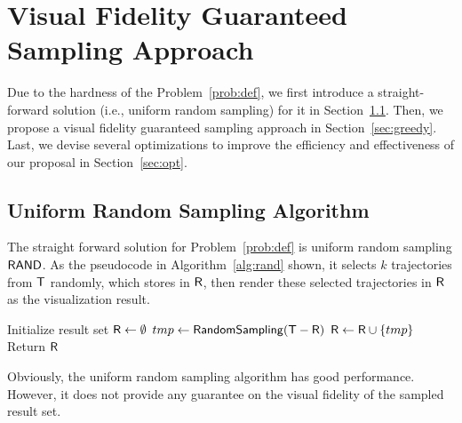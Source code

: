 \section{Visual Fidelity Guaranteed Sampling Approach}\label{sec:sol}
Due to the hardness of the Problem~\ref{prob:def}, we first introduce a straight-forward solution (i.e., uniform random sampling) for it in Section~\ref{sec:random}.
Then, we propose a visual fidelity guaranteed sampling approach in Section~\ref{sec:greedy}.
Last, we devise several optimizations to improve the efficiency and effectiveness of our proposal in Section~\ref{sec:opt}.


\subsection{Uniform Random Sampling Algorithm}\label{sec:random}
The straight forward solution for Problem~\ref{prob:def} is uniform random sampling $\mathsf{RAND}$.
As the pseudocode in Algorithm~\ref{alg:rand} shown, it selects $k$ trajectories from $\mathsf{T}$ randomly, which stores in $\mathsf{R}$,
then render these selected trajectories in $\mathsf{R}$ as the visualization result.

\begin{algorithm}
    \caption{$\rand(\D,k=\alpha |\D|)$} \label{alg:rand}
    \begin{algorithmic}[1]
    \State Initialize result set $\mathsf{R} \leftarrow \emptyset$
        \State $tmp \leftarrow \mathsf{RandomSampling(\mathsf{T}-\mathsf{R})}$
        \State $\mathsf{R} \leftarrow \mathsf{R} \cup \{ tmp \}$
    \EndWhile
    \State Return $\mathsf{R}$
    \end{algorithmic}
\end{algorithm}

Obviously, the uniform random sampling algorithm has good performance.
However, it does not provide any guarantee on the visual fidelity of the sampled result set.





